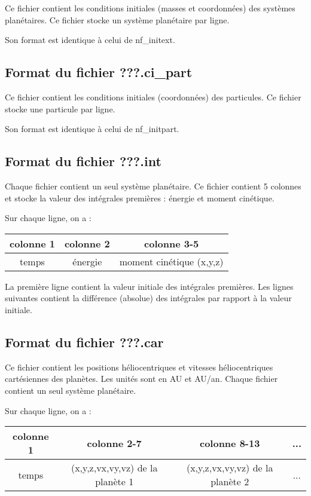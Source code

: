 \documentclass[11pt]{article}
\begin{document}
Ce fichier contient les conditions initiales (masses et coordonn\'ees) des syst\`emes plan\'etaires. 
Ce fichier stocke un syst\`eme plan\'etaire par ligne.

Son format est identique \`a   celui de nf\_initext.

\subsection{Format du fichier {\bf ???.ci\_part} }

Ce fichier contient les conditions initiales (coordonn\'ees) des particules. 
Ce fichier stocke une particule par ligne.

Son format est identique \`a   celui de nf\_initpart.



\subsection{Format du fichier {\bf ???.int} }

Chaque fichier contient un seul syst\`eme plan\'etaire.
Ce fichier contient 5 colonnes et stocke la valeur des int\'egrales premi\`eres  : \'energie et moment cin\'etique.

Sur chaque ligne, on a : 

\begin{tabular}{|c|c|c|} \hline
colonne 1 &  colonne 2 & colonne 3-5 \\ \hline
temps & \'energie & moment cin\'etique (x,y,z)\\    \hline
\end{tabular}

La premi\`ere ligne contient la valeur initiale des int\'egrales premi\`eres. Les lignes suivantes contient la différence (absolue) des intégrales par rapport à la valeur initiale.


\subsection{Format du fichier {\bf ???.car} }

Ce fichier contient les positions h\'eliocentriques et vitesses h\'eliocentriques cart\'esiennes des plan\`etes. Les unit\'es sont en AU et AU/an.
Chaque fichier contient un seul syst\`eme plan\'etaire.


Sur chaque ligne, on a : 

\begin{tabular}{|c|c|c|c|} \hline
colonne 1 &   colonne 2-7 & colonne 8-13 & ... \\ \hline
temps & (x,y,z,vx,vy,vz) de la plan\`ete 1  & (x,y,z,vx,vy,vz) de la plan\`ete 2 & ... \\    \hline
\end{tabular}
\end{document}
